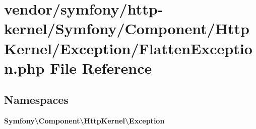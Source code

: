 \section{vendor/symfony/http-\/kernel/\+Symfony/\+Component/\+Http\+Kernel/\+Exception/\+Flatten\+Exception.php File Reference}
\label{http-kernel_2_symfony_2_component_2_http_kernel_2_exception_2_flatten_exception_8php}
\subsection*{Namespaces}
\begin{DoxyCompactItemize}
\item 
 {\bf Symfony\textbackslash{}\+Component\textbackslash{}\+Http\+Kernel\textbackslash{}\+Exception}
\end{DoxyCompactItemize}
